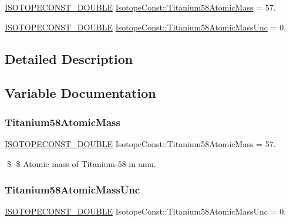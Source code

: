 \begin{DoxyCompactItemize}
\item 
\mbox{\hyperlink{group___isotope_const-_macros_ga8f45a7272ce02c0b4c65c44636ed719a}{I\+S\+O\+T\+O\+P\+E\+C\+O\+N\+S\+T\+\_\+\+D\+O\+U\+B\+LE}} \mbox{\hyperlink{group___isotope_const-_titanium-_ti58_gae3ef0aac5ffa9fcd9cc4570dfed9bac7}{Isotope\+Const\+::\+Titanium58\+Atomic\+Mass}} = 57.
\item 
\mbox{\hyperlink{group___isotope_const-_macros_ga8f45a7272ce02c0b4c65c44636ed719a}{I\+S\+O\+T\+O\+P\+E\+C\+O\+N\+S\+T\+\_\+\+D\+O\+U\+B\+LE}} \mbox{\hyperlink{group___isotope_const-_titanium-_ti58_gaa0c2eb815109c4282d02b8e5722ed6f2}{Isotope\+Const\+::\+Titanium58\+Atomic\+Mass\+Unc}} = 0.
\end{DoxyCompactItemize}


\subsection{Detailed Description}


\subsection{Variable Documentation}
\mbox{\label{group___isotope_const-_titanium-_ti58_gae3ef0aac5ffa9fcd9cc4570dfed9bac7}} 
\subsubsection{\texorpdfstring{Titanium58\+Atomic\+Mass}{Titanium58AtomicMass}}
{\footnotesize\ttfamily \mbox{\hyperlink{group___isotope_const-_macros_ga8f45a7272ce02c0b4c65c44636ed719a}{I\+S\+O\+T\+O\+P\+E\+C\+O\+N\+S\+T\+\_\+\+D\+O\+U\+B\+LE}} Isotope\+Const\+::\+Titanium58\+Atomic\+Mass = 57.}

\$ \$ Atomic mass of Titanium-\/58 in amu. \mbox{\label{group___isotope_const-_titanium-_ti58_gaa0c2eb815109c4282d02b8e5722ed6f2}} 
\subsubsection{\texorpdfstring{Titanium58\+Atomic\+Mass\+Unc}{Titanium58AtomicMassUnc}}
{\footnotesize\ttfamily \mbox{\hyperlink{group___isotope_const-_macros_ga8f45a7272ce02c0b4c65c44636ed719a}{I\+S\+O\+T\+O\+P\+E\+C\+O\+N\+S\+T\+\_\+\+D\+O\+U\+B\+LE}} Isotope\+Const\+::\+Titanium58\+Atomic\+Mass\+Unc = 0.}


